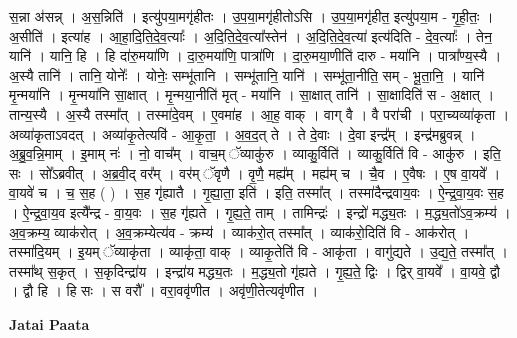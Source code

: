 \documentclass[17pt]{extarticle}
\begin{document}
स॒न्ना अ॑सन्न् । अ॒स॒न्निति॑ । इत्यु॑पया॒मगृ॑हीतः । उ॒प॒या॒मगृ॑हीतोऽसि । उ॒प॒या॒मगृ॑हीत॒ इत्यु॑पया॒म - गृ॒ही॒तः॒ । अ॒सीति॑ । इत्या॑ह । आ॒हा॒दि॒ति॒दे॒व॒त्याः᳚ । अ॒दि॒ति॒दे॒व॒त्या᳚स्तेन॑ । अ॒दि॒ति॒दे॒व॒त्या॑ इत्य॑दिति - दे॒व॒त्याः᳚ । तेन॒ यानि॑ । यानि॒ हि । हि दा॑रु॒मया॑णि । दा॒रु॒मया॑णि॒ पात्रा॑णि । दा॒रु॒मया॒णीति॑ दारु - मया॑नि । पात्रा᳚ण्य॒स्यै । अ॒स्यै तानि॑ । तानि॒ योनेः᳚ । योनेः॒ सम्भू॑तानि । सम्भू॑तानि॒ यानि॑ । सम्भू॑ता॒नीति॒ सम् - भू॒ता॒नि॒ । यानि॑ मृ॒न्मया॑नि । मृ॒न्मया॑नि सा॒क्षात् । मृ॒न्मया॒नीति॑ मृत् - मया॑नि । सा॒क्षात् तानि॑ । सा॒क्षादिति॑ स - अ॒क्षात् । तान्य॒स्यै । अ॒स्यै तस्मा᳚त् । तस्मा॑दे॒वम् । ए॒वमा॑ह । आ॒ह॒ वाक् । वाग् वै । वै परा॑ची । परा॒च्यव्या॑कृता । अव्या॑कृताऽवदत् । अव्या॑कृ॒तेत्यवि॑ - आ॒कृ॒ता॒ । अ॒व॒द॒त् ते । ते दे॒वाः । दे॒वा इन्द्र᳚म् । इन्द्र॑मब्रुवन्न् । अ॒ब्रु॒व॒न्नि॒माम् । इ॒माम् नः॑ । नो॒ वाच᳚म् । वाच॒म् ॅव्याकु॑रु । व्याकु॒र्विति॑ । व्याकु॒र्विति॑ वि - आकु॑रु । इति॒ सः । सो᳚ऽब्रवीत् । अ॒ब्र॒वी॒द् वर᳚म् । वर॑म् ॅवृणै । वृ॒णै॒ मह्य᳚म् । मह्य॑म् च । चै॒व । ए॒वैषः । ए॒ष वा॒यवे᳚ । वा॒यवे॑ च । च॒ स॒ह ( ) । स॒ह गृ॑ह्यातै । गृ॒ह्या॒ता॒ इति॑ । इति॒ तस्मा᳚त् । तस्मा॑दैन्द्रवाय॒वः । ऐ॒न्द्र॒वा॒य॒वः स॒ह । ऐ॒न्द्र॒वा॒य॒व इत्यै᳚न्द्र - वा॒य॒वः । स॒ह गृ॑ह्यते । गृ॒ह्य॒ते॒ ताम् । तामिन्द्रः॑ । इन्द्रो॑ मद्ध्य॒तः । म॒द्ध्य॒तो॑ऽव॒क्रम्य॑ । अ॒व॒क्रम्य॒ व्याक॑रोत् । अ॒व॒क्रम्येत्य॑व - क्रम्य॑ । व्याक॑रो॒त् तस्मा᳚त् । व्याक॑रो॒दिति॑ वि - आक॑रोत् । तस्मा॑दि॒यम् । इ॒यम् ॅव्याकृ॑ता । व्याकृ॑ता॒ वाक् । व्याकृ॒तेति॑ वि - आकृ॑ता । वागु॑द्यते । उ॒द्य॒ते॒ तस्मा᳚त् । तस्मा᳚थ् स॒कृत् । स॒कृदिन्द्रा॑य । इन्द्रा॑य मद्ध्य॒तः । म॒द्ध्य॒तो गृ॑ह्यते । गृ॒ह्य॒ते॒ द्विः । द्विर् वा॒यवे᳚ । वा॒यवे॒ द्वौ । द्वौ हि । हि सः । स वरौ᳚ । वरा॒ववृ॑णीत । अवृ॑णी॒तेत्यवृ॑णीत । \newline

\textbf{Jatai Paata} \newline
\end{document}
